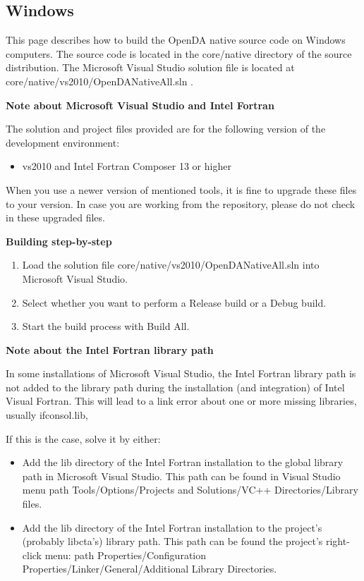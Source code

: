 \subsection{Windows}
\label{dc:build:windows}

This page describes how to build the OpenDA native source code on Windows computers. The source code is located in the core/native directory of the source distribution. The Microsoft Visual Studio solution file is located at core/native/vs2010/OpenDANativeAll.sln .

\textbf{Note about Microsoft Visual Studio and Intel Fortran}

The solution and project files provided are for the following version of the development environment:

\begin{itemize}
	\item vs2010 and Intel Fortran Composer 13 or higher
\end{itemize}

When you use a newer version of mentioned tools, it is fine to upgrade these files to your version. In case you are working from the repository, please do not check in these upgraded files. 

\textbf{Building step-by-step}

\begin{enumerate}
	\item Load the solution file core/native/vs2010/OpenDANativeAll.sln into Microsoft Visual Studio.
	\item Select whether you want to perform a Release build or a Debug build.
	\item Start the build process with Build All.
\end{enumerate}

\textbf{Note about the Intel Fortran library path}

In some installations of Microsoft Visual Studio, the Intel Fortran library path is not added to the library path during the installation (and integration) of Intel Visual Fortran. This will lead to a link error about one or more missing libraries, usually ifconsol.lib,

If this is the case, solve it by either:

\begin{itemize}
	\item Add the lib directory of the Intel Fortran installation to the global library path in Microsoft Visual Studio. This path can be found in Visual Studio menu path Tools/Options/Projects and Solutions/VC++ Directories/Library files.
	\item Add the lib directory of the Intel Fortran installation to the project's (probably libcta's) library path. This path can be found the project's right-click menu: path Properties/Configuration Properties/Linker/General/Additional Library Directories.
\end{itemize}
    
    

